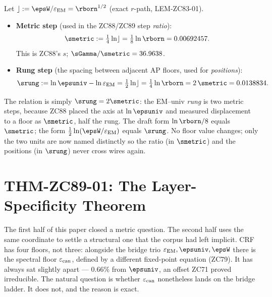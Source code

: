 \documentclass[12pt, a4paper]{article}
\renewcommand{\epsEM}{\varepsilon_{\rm EM}}     %
\renewcommand{\epscan}{\varepsilon_{\rm can}}   %
\begin{document}
\begin{formalbox}[title={Two bridge steps, pinned (PWA-9 lock)}]
Let $\rfloor:=\epsW/\epsEM=\rborn^{1/2}$ (exact $r$-path, LEM-ZC83-01).
\begin{itemize}[leftmargin=2em, noitemsep]
  \item \textbf{Metric step} (used in the ZC88/ZC89 step \emph{ratio}):
    \[
      \smetric := \tfrac14\ln\rfloor = \tfrac18\ln\rborn = 0.00692457.
    \]
    This is ZC88's $s$; $\sGamma/\smetric=36.9638$.
  \item \textbf{Rung step} (the spacing between adjacent AP floors, used for
    \emph{positions}):
    \[
      \srung := \ln\epsuniv-\ln\epsEM = \tfrac12\ln\rfloor
              = \tfrac14\ln\rborn = 2\,\smetric = 0.0138834.
    \]
\end{itemize}
The relation is simply $\srung=2\smetric$: the EM--univ \emph{rung} is two
metric steps, because ZC88 placed the axis at $\ln\epsuniv$ and measured
displacement to a floor as $\smetric$, half the rung. The draft form
$\ln\rborn/8$ equals $\smetric$; the form $\tfrac12\ln(\epsW/\epsEM)$
equals $\srung$. No floor value changes; only the two units are now
named distinctly so the ratio (in $\smetric$) and the positions (in
$\srung$) never cross wires again.
\end{formalbox}

\section{THM-ZC89-01: The Layer-Specificity Theorem}
\label{sec:thm-zc89}

The first half of this paper closed a metric question. The second half uses
the same coordinate to settle a structural one that the corpus had left
implicit. CRF has four floors, not three: alongside the bridge trio
$\epsEM,\epsuniv,\epsW$ there is the spectral floor $\epscan$, defined by a
different fixed-point equation (ZC79). It has always sat slightly apart ---
$0.66\%$ from $\epsuniv$, an offset ZC71 proved irreducible. The natural
question is whether $\epscan$ nonetheless lands on the bridge ladder. It
does not, and the reason is exact.

\end{document}
